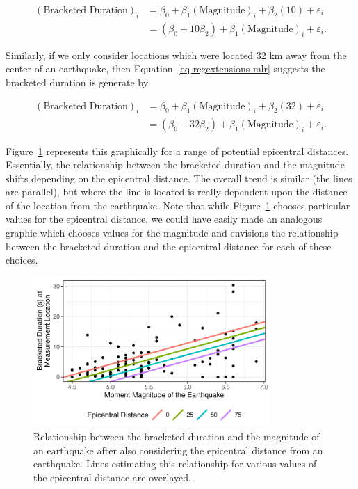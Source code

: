 \documentclass[
  letterpaper,
  DIV=11,
  numbers=noendperiod]{scrreprt}
\theoremstyle{definition}
\theoremstyle{definition}
\theoremstyle{plain}
\theoremstyle{remark}
\begin{document}
\[
\begin{aligned}
(\text{Bracketed Duration})_i 
  &= \beta_0 + \beta_1(\text{Magnitude})_i + \beta_2(10) + \varepsilon_i \\
  &= \left(\beta_0 + 10\beta_2\right) + \beta_1(\text{Magnitude})_i + \varepsilon_i.
\end{aligned}
\]

Similarly, if we only consider locations which were located 32 km away
from the center of an earthquake, then
Equation~\ref{eq-regextensions-mlr} suggests the bracketed duration is
generate by

\[
\begin{aligned}
(\text{Bracketed Duration})_i 
  &= \beta_0 + \beta_1(\text{Magnitude})_i + \beta_2(32) + \varepsilon_i \\
  &= \left(\beta_0 + 32\beta_2\right) + \beta_1(\text{Magnitude})_i + \varepsilon_i.
\end{aligned}
\]

Figure~\ref{fig-regextensions-mlr-plot} represents this graphically for
a range of potential epicentral distances. Essentially, the relationship
between the bracketed duration and the magnitude shifts depending on the
epicentral distance. The overall trend is similar (the lines are
parallel), but where the line is located is really dependent upon the
distance of the location from the earthquake. Note that while
Figure~\ref{fig-regextensions-mlr-plot} chooses particular values for
the epicentral distance, we could have easily made an analogous graphic
which chooses values for the magnitude and envisions the relationship
between the bracketed duration and the epicentral distance for each of
these choices.

\begin{figure}

{\centering \includegraphics[width=0.8\textwidth,height=\textheight]{./images/fig-regextensions-mlr-plot-1.pdf}

}

\caption{\label{fig-regextensions-mlr-plot}Relationship between the
bracketed duration and the magnitude of an earthquake after also
considering the epicentral distance from an earthquake. Lines estimating
this relationship for various values of the epicentral distance are
overlayed.}

\end{figure}
\end{document}
